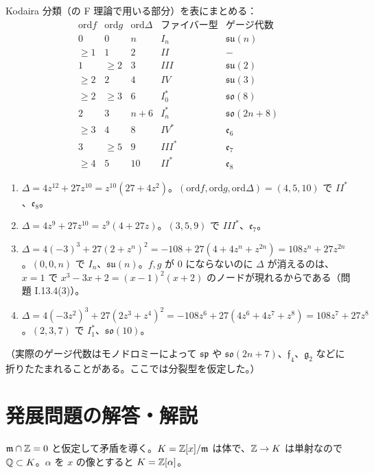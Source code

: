 Kodaira 分類（の F 理論で用いる部分）を表にまとめる：
\[
\begin{array}{c|c|c|c|c}
  \mathrm{ord}f & \mathrm{ord}g & \mathrm{ord}\Delta & \text{ファイバー型} & \text{ゲージ代数}\\\hline
  0 & 0 & n & I_n & \mathfrak{su}(n)\\
  \geq1 & 1 & 2 & II & -\\
  1 & \geq2 & 3 & III & \mathfrak{su}(2)\\
  \geq2 & 2 & 4 & IV & \mathfrak{su}(3)\\
  \geq2 & \geq3 & 6 & I_0^* & \mathfrak{so}(8)\\
  2 & 3 & n+6 & I_n^* & \mathfrak{so}(2n+8)\\
  \geq3 & 4 & 8 & IV^* & \mathfrak{e}_6\\
  3 & \geq5 & 9 & III^* & \mathfrak{e}_7\\
  \geq4 & 5 & 10 & II^* & \mathfrak{e}_8
\end{array}
\]
\begin{enumerate}
  \item $\Delta=4z^{12}+27z^{10}=z^{10}(27+4z^2)$。$(\mathrm{ord}f,\mathrm{ord}g,\mathrm{ord}\Delta)=(4,5,10)$ で $II^*$、$\mathfrak{e}_8$。
  \item $\Delta=4z^9+27z^{10}=z^9(4+27z)$。$(3,5,9)$ で $III^*$、$\mathfrak{e}_7$。
  \item $\Delta=4(-3)^3+27(2+z^n)^2=-108+27(4+4z^n+z^{2n})=108z^n+27z^{2n}$。$(0,0,n)$ で $I_n$、$\mathfrak{su}(n)$。$f,g$ が $0$ にならないのに $\Delta$ が消えるのは、$x=1$ で $x^3-3x+2=(x-1)^2(x+2)$ のノードが現れるからである（問題 I.13.4(3)）。
  \item $\Delta=4(-3z^2)^3+27(2z^3+z^4)^2=-108z^6+27(4z^6+4z^7+z^8)=108z^7+27z^8$。$(2,3,7)$ で $I_1^*$、$\mathfrak{so}(10)$。
\end{enumerate}
（実際のゲージ代数はモノドロミーによって $\mathfrak{sp}$ や $\mathfrak{so}(2n+7)$、$\mathfrak{f}_4$、$\mathfrak{g}_2$ などに折りたたまれることがある。ここでは分裂型を仮定した。）

\section{発展問題の解答・解説}

$\mathfrak{m}\cap\mathbb{Z}=0$ と仮定して矛盾を導く。$K=\mathbb{Z}[x]/\mathfrak{m}$ は体で、$\mathbb{Z}\to K$ は単射なので $\mathbb{Q}\subset K$。$\alpha$ を $x$ の像とすると $K=\mathbb{Z}[\alpha]$。

